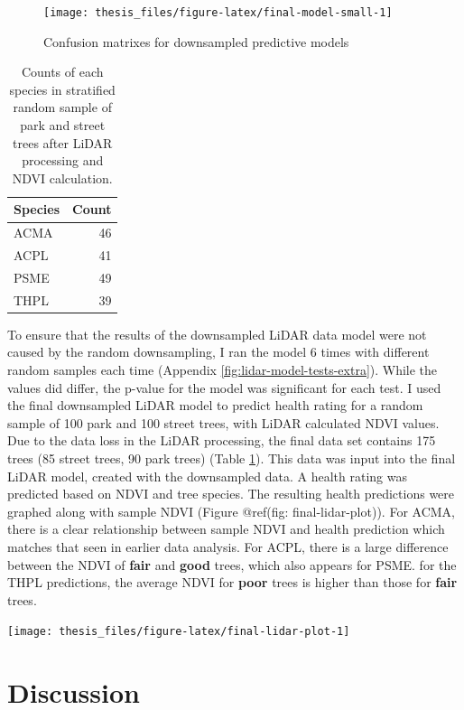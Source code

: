 \documentclass[12pt,twoside]{reedthesis}
\begin{document}
\begin{figure}

{\centering \texttt{[image: thesis\_files/figure-latex/final-model-small-1]} 

}

\caption{Confusion matrixes for downsampled predictive models}\label{fig:final-model-small}
\end{figure}
\begin{longtable}[t]{lr}
\caption[Species counts post LiDAR processing]{\label{tab:final-lidar-counts}Counts of each species in stratified random sample of park and street trees after LiDAR processing and NDVI calculation.}\\
\toprule
Species & Count\\
\midrule
ACMA & 46\\
ACPL & 41\\
PSME & 49\\
THPL & 39\\
\bottomrule
\end{longtable}
To ensure that the results of the downsampled LiDAR data model were not caused by the random downsampling, I ran the model 6 times with different random samples each time (Appendix \ref{fig:lidar-model-tests-extra}). While the values did differ, the p-value for the model was significant for each test. I used the final downsampled LiDAR model to predict health rating for a random sample of 100 park and 100 street trees, with LiDAR calculated NDVI values. Due to the data loss in the LiDAR processing, the final data set contains 175 trees (85 street trees, 90 park trees) (Table \ref{tab:final-lidar-counts}). This data was input into the final LiDAR model, created with the downsampled data. A health rating was predicted based on NDVI and tree species. The resulting health predictions were graphed along with sample NDVI (Figure @ref(fig: final-lidar-plot)). For ACMA, there is a clear relationship between sample NDVI and health prediction which matches that seen in earlier data analysis. For ACPL, there is a large difference between the NDVI of \textbf{fair} and \textbf{good} trees, which also appears for PSME. for the THPL predictions, the average NDVI for \textbf{poor} trees is higher than those for \textbf{fair} trees.
\begin{center}\texttt{[image: thesis\_files/figure-latex/final-lidar-plot-1]} \end{center}

\hypertarget{discussion}{%
\chapter{Discussion}\label{discussion}}
\end{document}
